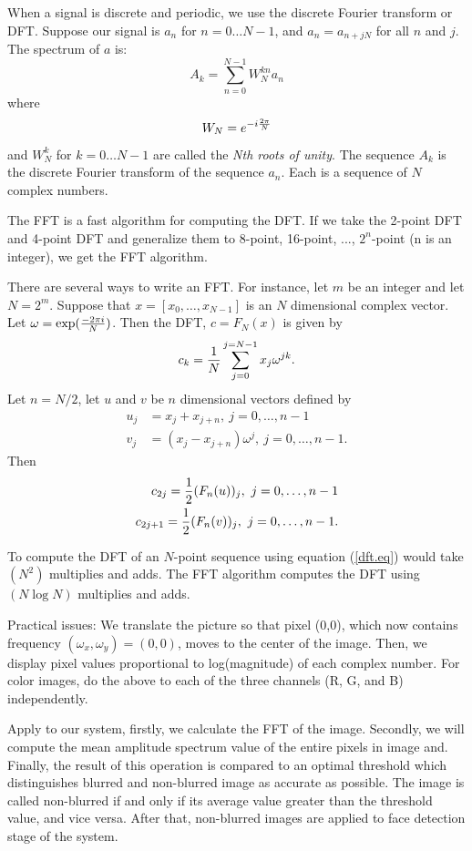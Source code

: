 \documentclass[journal, twocolumn]{IEEEtran}
\begin{document}
When a signal is discrete and periodic, we use the discrete Fourier transform or DFT.
Suppose our signal is $a_n$ for $n=0 \ldots N-1$,
and $a_n=a_{n+jN}$ for all $n$ and $j$.
The spectrum of $a$ is:
\begin{equation}
A_k = \sum_{n=0}^{N-1} W_N^{kn} a_n
\label{dft.eq}
\end{equation}
where
$$
W_N = e^{-i {2 \pi \over N}}
$$
and $W_N^k$ for $k=0 \ldots N-1$ are called the {\it Nth roots of unity}.
The sequence $A_k$ is the discrete Fourier transform of the sequence $a_n$.
Each is a sequence of $N$ complex numbers.

The FFT is a fast algorithm for computing the DFT.
If we take the 2-point DFT and 4-point DFT and generalize them
to 8-point, 16-point, ..., $2^n$-point (n is an integer), we get the FFT algorithm.

There are several ways to write an FFT. For instance, let $m$ be an integer and let $N=2^m$.
Suppose that $x=[x_0,\ldots,x_{N-1}]$ is an $N$ dimensional complex vector.
Let $\omega=\exp({-2\pi i\over N})$.  Then the DFT, $c= F_N(x)$ is given by
\begin{equation}
c_k={1\over N}\sum_{j=0}^{j=N-1}x_j\omega^{jk}.
\end{equation}
Let $n=N/2$, let $u$ and $v$ be $n$ dimensional vectors defined by 
\begin{align}
u_j&=x_j+x_{j+n},\ j=0,\ldots,n-1\\
v_j&=(x_j-x_{j+n})\omega ^j,\ j=0,\ldots,n-1.
\end{align}
Then 
\begin{align}
c_{2j}={1\over 2}(F_n(u))_j,\ j=0,\ldots,n-1\\
c_{2j+1}={1\over 2}(F_n(v))_j,\ j=0,\ldots,n-1.
\end{align}

To compute the DFT of an $N$-point sequence using equation (\ref{dft.eq})
would take $(N^2)$ multiplies and adds.
The FFT algorithm computes the DFT using $(N \log N)$ multiplies and adds.

Practical issues:
We translate the picture so that pixel (0,0), which now contains frequency $(\omega_x,\omega_y)=(0,0)$, moves to the center of the image. Then, we display pixel values proportional to
log(magnitude) of each complex number. For color images, do the above to each of the three channels
(R, G, and B) independently.

Apply to our system, firstly, we calculate the FFT of the image. Secondly, we will compute the mean amplitude spectrum value of the entire pixels in image and. Finally, the result of this operation is compared to an optimal threshold which distinguishes blurred and non-blurred image as accurate as possible. The image is called non-blurred if and only if its average value greater than the threshold value, and vice versa. After that, non-blurred images are applied to face detection stage of the system.
\end{document}
